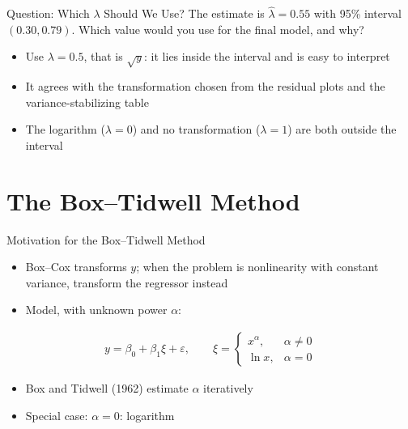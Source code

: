 \begin{frame}{Question: Which $\lambda$ Should We Use?}
The estimate is $\hat{\lambda} = 0.55$ with 95\% interval $(0.30, 0.79)$. Which value would you use for the final model, and why?

\pause

\svspace{0.5em}

\begin{itemize}
    \item Use $\lambda = 0.5$, that is $\sqrt{y}$: it lies inside the interval and is easy to interpret
    \item It agrees with the transformation chosen from the residual plots and the variance-stabilizing table
    \item The logarithm ($\lambda = 0$) and no transformation ($\lambda = 1$) are both outside the interval
\end{itemize}
\end{frame}



\section{The Box--Tidwell Method}


\begin{frame}{Motivation for the Box--Tidwell Method}
\begin{itemize}
    \item Box--Cox transforms $y$; when the problem is nonlinearity with constant variance, transform the regressor instead
    \item Model, with unknown power $\alpha$:
\end{itemize}
\begin{align*}
    y = \beta_0 + \beta_1 \xi + \varepsilon, \qquad
    \xi =
    \begin{cases}
        x^\alpha, & \alpha \neq 0 \\
        \ln x, & \alpha = 0
    \end{cases}
\end{align*}
\begin{itemize}
    \item Box and Tidwell (1962) estimate $\alpha$ iteratively
    \item Special case: $\alpha = 0$: logarithm
\end{itemize}
\end{frame}



